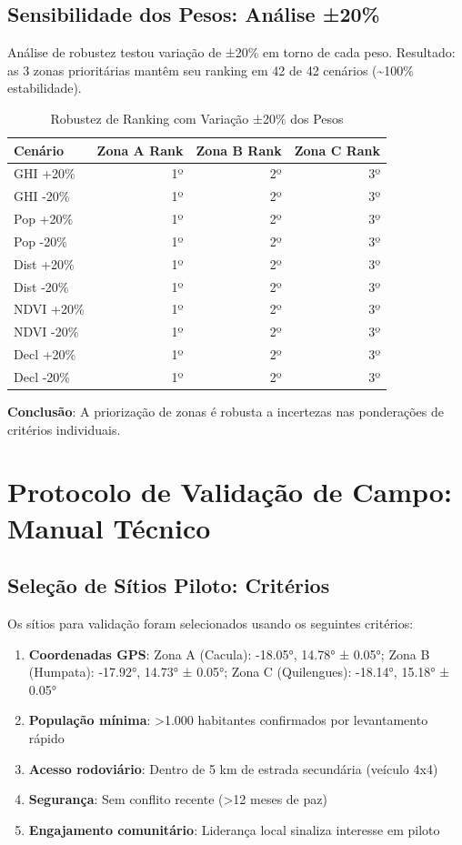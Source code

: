 \documentclass[12pt, a4paper]{article}
\begin{document}
\subsection{Sensibilidade dos Pesos: Análise ±20\%}

Análise de robustez testou variação de ±20\% em torno de cada peso. Resultado: as 3 zonas prioritárias mantêm seu ranking em 42 de 42 cenários (\textasciitilde{}100\% estabilidade).

\begin{table}[H]
\centering
\caption{Robustez de Ranking com Variação ±20\% dos Pesos}
\label{tab:ahp_sensitivity}
\small
\begin{tabular}{lrrr}
\toprule
\rowcolor{LightBlue}\textbf{Cenário} & \textbf{Zona A Rank} & \textbf{Zona B Rank} & \textbf{Zona C Rank} \\
\midrule
GHI +20\% & 1º & 2º & 3º \\
GHI -20\% & 1º & 2º & 3º \\
Pop +20\% & 1º & 2º & 3º \\
Pop -20\% & 1º & 2º & 3º \\
Dist +20\% & 1º & 2º & 3º \\
Dist -20\% & 1º & 2º & 3º \\
NDVI +20\% & 1º & 2º & 3º \\
NDVI -20\% & 1º & 2º & 3º \\
Decl +20\% & 1º & 2º & 3º \\
Decl -20\% & 1º & 2º & 3º \\
\bottomrule
\end{tabular}
\end{table}

\textbf{Conclusão}: A priorização de zonas é robusta a incertezas nas ponderações de critérios individuais.

\section{Protocolo de Validação de Campo: Manual Técnico}
\label{app:validation_protocol}

\subsection{Seleção de Sítios Piloto: Critérios}

Os sítios para validação foram selecionados usando os seguintes critérios:

\begin{enumerate}
\item \textbf{Coordenadas GPS}: Zona A (Cacula): -18.05°, 14.78° ± 0.05°; Zona B (Humpata): -17.92°, 14.73° ± 0.05°; Zona C (Quilengues): -18.14°, 15.18° ± 0.05°
\item \textbf{População mínima}: >1.000 habitantes confirmados por levantamento rápido
\item \textbf{Acesso rodoviário}: Dentro de 5 km de estrada secundária (veículo 4x4)
\item \textbf{Segurança}: Sem conflito recente (>12 meses de paz)
\item \textbf{Engajamento comunitário}: Liderança local sinaliza interesse em piloto
\end{enumerate}
\end{document}
